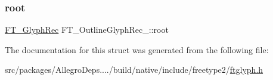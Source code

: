 \subsubsection{\texorpdfstring{root}{root}}
{\footnotesize\ttfamily \hyperlink{ftglyph_8h_a095b515f46c978b33ffc9c20aad081a4}{F\+T\+\_\+\+Glyph\+Rec} F\+T\+\_\+\+Outline\+Glyph\+Rec\+\_\+\+::root}



The documentation for this struct was generated from the following file\+:\begin{DoxyCompactItemize}
\item 
src/packages/\+Allegro\+Deps..../build/native/include/freetype2/\hyperlink{ftglyph_8h}{ftglyph.\+h}\end{DoxyCompactItemize}
